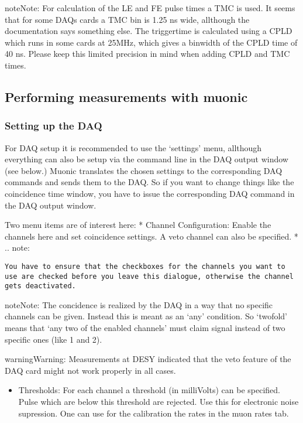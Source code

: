 \documentclass[letterpaper,10pt,english]{sphinxmanual}
\begin{document}
\begin{notice}{note}{Note:}
For calculation of the LE and FE pulse times a TMC is used. It seems that for some DAQs cards a TMC bin is 1.25 ns wide, allthough the documentation says something else.
The triggertime is calculated using a CPLD which runs in some cards at 25MHz, which gives a binwidth of the CPLD time of 40 ns.
Please keep this limited precision in mind when adding CPLD and TMC times.
\end{notice}


\subsection{Performing measurements with muonic}
\label{tutorial:performing-measurements-with-muonic}

\subsubsection{Setting up the DAQ}
\label{tutorial:setting-up-the-daq}
For DAQ setup it is recommended to use the `settings' menu, allthough everything can also be setup via the command line in the DAQ output window (see below.)
Muonic translates the chosen settings to the corresponding DAQ commands and sends them to the DAQ. So if you want to change things like the coincidence time window, you have to issue the corresponding DAQ command in the DAQ output window.

Two menu items are of interest here:
* Channel Configuration: Enable the channels here and set coincidence settings. A veto channel can also be specified.
*
.. note:

\begin{Verbatim}[commandchars=\\\{\}]
You have to ensure that the checkboxes for the channels you want to use are checked before you leave this dialogue, otherwise the channel gets deactivated.
\end{Verbatim}

\begin{notice}{note}{Note:}
The concidence is realized by the DAQ in a way that no specific channels can be given. Instead this is meant as an `any' condition.
So `twofold' means that `any two of the enabled channels' must claim signal instead of two specific ones (like 1 and 2).
\end{notice}

\begin{notice}{warning}{Warning:}
Measurements at DESY indicated that the veto feature of the DAQ card might not work properly in all cases.
\end{notice}
\begin{itemize}
\item {} 
Thresholds: For each channel a threshold (in milliVolts) can be specified. Pulse which are below this threshold are rejected. Use this for electronic noise supression. One can use for the calibration the rates in the muon rates tab.

\end{itemize}
\end{document}
